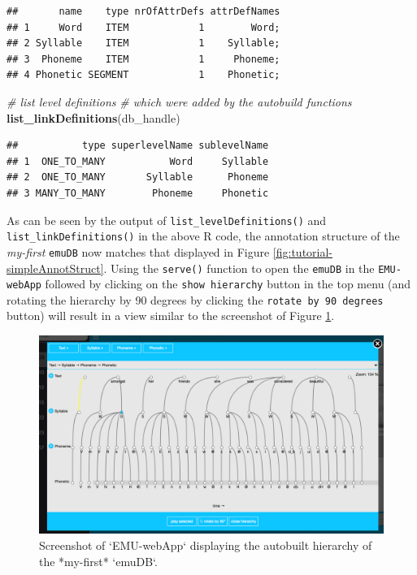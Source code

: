 \documentclass[]{book}
\newenvironment{Shaded}{\begin{snugshade}}{\end{snugshade}}
\newcommand{\CommentTok}[1]{\textcolor[rgb]{0.56,0.35,0.01}{\textit{#1}}}
\newcommand{\KeywordTok}[1]{\textcolor[rgb]{0.13,0.29,0.53}{\textbf{#1}}}
\newcommand{\NormalTok}[1]{#1}
\theoremstyle{definition}
\theoremstyle{definition}
\theoremstyle{definition}
\theoremstyle{remark}
\begin{document}
\begin{verbatim}
##       name    type nrOfAttrDefs attrDefNames
## 1     Word    ITEM            1        Word;
## 2 Syllable    ITEM            1    Syllable;
## 3  Phoneme    ITEM            1     Phoneme;
## 4 Phonetic SEGMENT            1    Phonetic;
\end{verbatim}

\begin{Shaded}
\begin{Highlighting}[]
\CommentTok{# list level definitions}
\CommentTok{# which were added by the autobuild functions}
\KeywordTok{list_linkDefinitions}\NormalTok{(db_handle)}
\end{Highlighting}
\end{Shaded}

\begin{verbatim}
##           type superlevelName sublevelName
## 1  ONE_TO_MANY           Word     Syllable
## 2  ONE_TO_MANY       Syllable      Phoneme
## 3 MANY_TO_MANY        Phoneme     Phonetic
\end{verbatim}

As can be seen by the output of \texttt{list\_levelDefinitions()} and
\texttt{list\_linkDefinitions()} in the above R code, the annotation
structure of the \emph{my-first} \texttt{emuDB} now matches that
displayed in Figure \ref{fig:tutorial-simpleAnnotStruct}. Using the
\texttt{serve()} function to open the \texttt{emuDB} in the
\texttt{EMU-webApp} followed by clicking on the \texttt{show\ hierarchy}
button in the top menu (and rotating the hierarchy by 90 degrees by
clicking the \texttt{rotate\ by\ 90\ degrees} button) will result in a
view similar to the screenshot of Figure
\ref{fig:tutorial-EMU-webAppScreenshotTutorialPostAutobHier}.

\begin{figure}

{\centering \includegraphics[width=1\linewidth]{pics/EMU-webAppScreenshotTutorialPostAutobHier} 

}

\caption{Screenshot of `EMU-webApp` displaying the autobuilt hierarchy of the *my-first* `emuDB`.}\label{fig:tutorial-EMU-webAppScreenshotTutorialPostAutobHier}
\end{figure}
\end{document}
